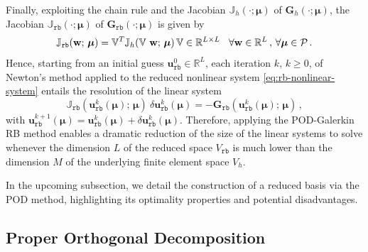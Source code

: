 \documentclass[12pt, a4paper, twoside, openright, notitlepage]{report}
\numberwithin{equation}{chapter}
\theoremstyle{theorem}
\theoremstyle{definition}
\theoremstyle{remark}
\theoremstyle{proposition}
\numberwithin{figure}{chapter}
\newcommand{\bg}[1]{\boldsymbol{#1}}
\begin{document}
		Finally, exploiting the chain rule and the Jacobian $\mathbb{J}_h(\cdot; \bg{\mu})$ of $\mathbf{G}_h(\cdot; \bg{\mu})$, the Jacobian $\mathbb{J}_{\texttt{rb}}(\cdot; \bg{\mu})$ of $\mathbf{G}_{\texttt{rb}}(\cdot; \bg{\mu})$ is given by
		\begin{equation}
			\label{eq:rb-nonlinear-system-jacobian}
			\mathbb{J}_{\texttt{rb}}(\mathbf{w}; \, \bg{\mu}) = \mathbb{V}^T \mathbb{J}_h(\mathbb{V} ~ \mathbf{w}; \, \bg{\mu}) \, \mathbb{V} \in \mathbb{R}^{L \times L} \hspace*{0.3cm} \forall \mathbf{w} \in \mathbb{R}^L \, , \, \forall \bg{\mu} \in \mathcal{P} \, .
		\end{equation}
		Hence, starting from an initial guess $\mathbf{u}_{\texttt{rb}}^0 \in \mathbb{R}^L$, each iteration $k$, $k \geq 0$, of Newton's method applied to the reduced nonlinear system \eqref{eq:rb-nonlinear-system} entails the resolution of the linear system
		\begin{equation}
			\label{eq:rb-nonlinear-system-newton}
			\mathbb{J}_{\texttt{rb}}(\mathbf{u}_{\texttt{rb}}^k(\bg{\mu}); \, \bg{\mu}) ~ \delta \mathbf{u}_{\texttt{rb}}^k(\bg{\mu}) = - \mathbf{G}_{\texttt{rb}}(\mathbf{u}_{\texttt{rb}}^k(\bg{\mu}); \, \bg{\mu}) \, ,
		\end{equation}
		with $\mathbf{u}_{\texttt{rb}}^{k+1}(\bg{\mu}) = \mathbf{u}_{\texttt{rb}}^k(\bg{\mu}) + \delta \mathbf{u}_{\texttt{rb}}^k(\bg{\mu})$. Therefore, applying the POD-Galerkin RB method enables a dramatic reduction of the size of the linear systems to solve whenever the dimension $L$ of the reduced space $V_{\texttt{rb}}$ is much lower than the dimension $M$ of the underlying finite element space $V_h$. 
		
		In the upcoming subsection, we detail the construction of a reduced basis via the POD method, highlighting its optimality properties and potential disadvantages.
		
	\vspace*{0.3cm}
		
	\subsection{Proper Orthogonal Decomposition}
	\label{section:Proper Orthogonal Decomposition} 
		
\end{document}
